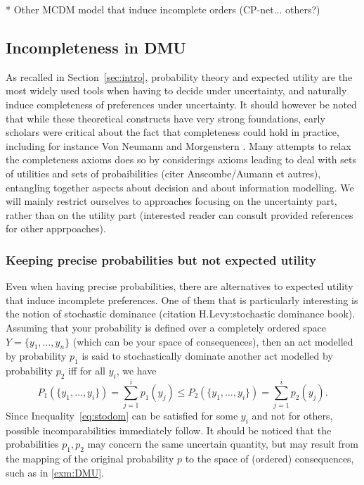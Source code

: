 \documentclass[french, english]{llncs}
\begin{document}
	* Other MCDM model that induce incomplete orders (CP-net... others?)
	
	\subsection{Incompleteness in DMU}
	
	As recalled in Section~\ref{sec:intro}, probability theory and expected utility are the most widely used tools when having to decide under uncertainty, and naturally induce completeness of preferences under uncertainty. It should however be noted that while these theoretical constructs have very strong foundations, early scholars were critical about the fact that completeness could hold in practice, including for instance Von Neumann and Morgenstern \citet[p. 19]{vNM}. Many attempts to relax the completeness axioms does so by considerings axioms leading to deal with sets of utilities and sets of probaibilities (citer Anscombe/Aumann et autres), entangling together aspects about decision and about information modelling. We will mainly restrict ourselves to approaches focusing on the uncertainty part, rather than on the utility part (interested reader can consult provided references for other apprpoaches). 
	
	\subsubsection{Keeping precise probabilities but not expected utility}
	
	Even when having precise probabilities, there are alternatives to expected utility that induce incomplete preferences. One of them that is particularly interesting is the notion of stochastic dominance (citation H.Levy:stochastic dominance book). Assuming that your probability is defined over a completely ordered space $Y=\{y_1,\ldots,y_n\}$ (which can be your space of consequences), then an act modelled by probability $p_1$ is said to stochastically dominate another act modelled by probability $p_2$ iff for all $y_i$, we have
	\begin{equation}\label{eq:stodom}P_1(\{y_1,\ldots,y_i\})=\sum_{j=1}^i p_1(y_j) \leq P_2(\{y_1,\ldots,y_i\})=\sum_{j=1}^i p_2(y_j).\end{equation}
	Since Inequality~\eqref{eq:stodom} can be satisfied for some $y_i$ and not for others, possible incomparabilities immediately follow. It should be noticed that the probabilities $p_1,p_2$ may concern the same uncertain quantity, but may result from the mapping of the original probability $p$ to the space of (ordered) consequences, such as in \cref{exm:DMU}.
	
\end{document}
